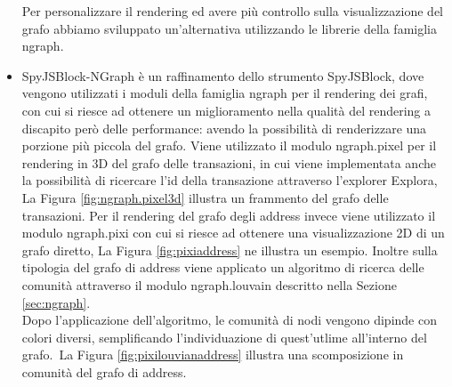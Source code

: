 \begin{itemize}
  Per personalizzare il rendering ed avere più controllo sulla visualizzazione del grafo abbiamo sviluppato un'alternativa utilizzando le librerie della famiglia ngraph.
  \item SpyJSBlock-NGraph è un raffinamento dello strumento SpyJSBlock, dove vengono utilizzati i moduli della famiglia ngraph per il rendering dei grafi, con cui si riesce ad ottenere un miglioramento nella qualità del rendering a discapito però delle performance: avendo la possibilità di renderizzare una porzione più piccola del grafo.
  Viene utilizzato il modulo ngraph.pixel per il rendering in 3D del grafo delle transazioni, in cui viene implementata anche la possibilità di ricercare l'id della transazione attraverso l'explorer Explora, La Figura \ref{fig:ngraph.pixel3d} illustra un frammento del grafo delle transazioni.
  Per il rendering del grafo degli address invece viene utilizzato il modulo ngraph.pixi con cui si riesce ad ottenere una visualizzazione 2D di un grafo diretto, La Figura \ref{fig:pixiaddress} ne illustra un esempio.
  Inoltre sulla tipologia del grafo di address viene applicato un algoritmo di ricerca delle comunità attraverso il modulo ngraph.louvain descritto nella Sezione \ref{sec:ngraph}.\\
  Dopo l'applicazione dell'algoritmo, le comunità di nodi vengono dipinde con colori diversi, semplificando l'individuazione di quest'utlime all'interno del grafo.\
  La Figura \ref{fig:pixilouvianaddress} illustra una scomposizione in comunità del grafo di address.


\end{itemize}
